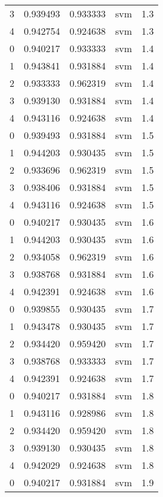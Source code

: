 \begin{tabular}{rrrlr}
     3 & 0.939493 & 0.933333 &      svm &        1.3 \\
     4 & 0.942754 & 0.924638 &      svm &        1.3 \\
     0 & 0.940217 & 0.933333 &      svm &        1.4 \\
     1 & 0.943841 & 0.931884 &      svm &        1.4 \\
     2 & 0.933333 & 0.962319 &      svm &        1.4 \\
     3 & 0.939130 & 0.931884 &      svm &        1.4 \\
     4 & 0.943116 & 0.924638 &      svm &        1.4 \\
     0 & 0.939493 & 0.931884 &      svm &        1.5 \\
     1 & 0.944203 & 0.930435 &      svm &        1.5 \\
     2 & 0.933696 & 0.962319 &      svm &        1.5 \\
     3 & 0.938406 & 0.931884 &      svm &        1.5 \\
     4 & 0.943116 & 0.924638 &      svm &        1.5 \\
     0 & 0.940217 & 0.930435 &      svm &        1.6 \\
     1 & 0.944203 & 0.930435 &      svm &        1.6 \\
     2 & 0.934058 & 0.962319 &      svm &        1.6 \\
     3 & 0.938768 & 0.931884 &      svm &        1.6 \\
     4 & 0.942391 & 0.924638 &      svm &        1.6 \\
     0 & 0.939855 & 0.930435 &      svm &        1.7 \\
     1 & 0.943478 & 0.930435 &      svm &        1.7 \\
     2 & 0.934420 & 0.959420 &      svm &        1.7 \\
     3 & 0.938768 & 0.933333 &      svm &        1.7 \\
     4 & 0.942391 & 0.924638 &      svm &        1.7 \\
     0 & 0.940217 & 0.931884 &      svm &        1.8 \\
     1 & 0.943116 & 0.928986 &      svm &        1.8 \\
     2 & 0.934420 & 0.959420 &      svm &        1.8 \\
     3 & 0.939130 & 0.930435 &      svm &        1.8 \\
     4 & 0.942029 & 0.924638 &      svm &        1.8 \\
     0 & 0.940217 & 0.931884 &      svm &        1.9 \\

\end{tabular}
